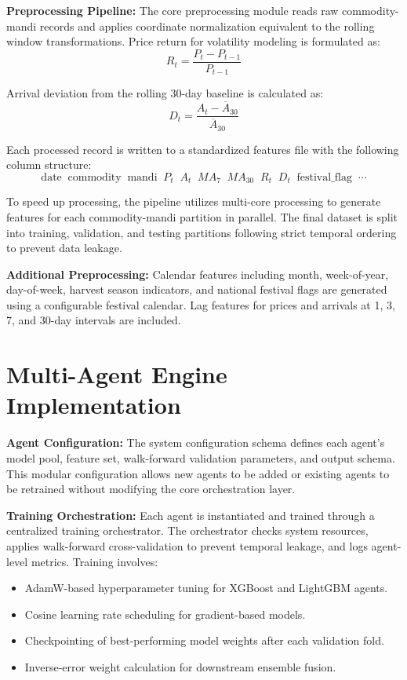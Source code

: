 \documentclass[12pt,a4paper]{report}
\theoremstyle{definition}
\theoremstyle{remark}
\begin{document}
\textbf{Preprocessing Pipeline:} The core preprocessing module reads raw commodity-mandi records and applies coordinate normalization equivalent to the rolling window transformations. Price return for volatility modeling is formulated as:
\begin{equation}
R_t = \frac{P_t - P_{t-1}}{P_{t-1}}
\end{equation}

Arrival deviation from the rolling 30-day baseline is calculated as:
\begin{equation}
\label{eq:arrdev}
D_t = \frac{A_t - \overline{A}_{30}}{\overline{A}_{30}}
\end{equation}

Each processed record is written to a standardized features file with the following column structure:
\begin{equation}
\label{eq:feat}
\text{date} \;\; \text{commodity} \;\; \text{mandi} \;\; P_t \;\; A_t \;\; MA_7 \;\; MA_{30} \;\; R_t \;\; D_t \;\; \text{festival\_flag} \;\; \cdots
\end{equation}

To speed up processing, the pipeline utilizes multi-core processing to generate features for each commodity-mandi partition in parallel. The final dataset is split into training, validation, and testing partitions following strict temporal ordering to prevent data leakage.

\textbf{Additional Preprocessing:} Calendar features including month, week-of-year, day-of-week, harvest season indicators, and national festival flags are generated using a configurable festival calendar. Lag features for prices and arrivals at 1, 3, 7, and 30-day intervals are included.

\section{Multi-Agent Engine Implementation}

\textbf{Agent Configuration:} The system configuration schema defines each agent's model pool, feature set, walk-forward validation parameters, and output schema. This modular configuration allows new agents to be added or existing agents to be retrained without modifying the core orchestration layer.

\textbf{Training Orchestration:} Each agent is instantiated and trained through a centralized training orchestrator. The orchestrator checks system resources, applies walk-forward cross-validation to prevent temporal leakage, and logs agent-level metrics. Training involves:
\begin{itemize}
\item AdamW-based hyperparameter tuning for XGBoost and LightGBM agents.
\item Cosine learning rate scheduling for gradient-based models.
\item Checkpointing of best-performing model weights after each validation fold.
\item Inverse-error weight calculation for downstream ensemble fusion.
\end{itemize}
\end{document}
